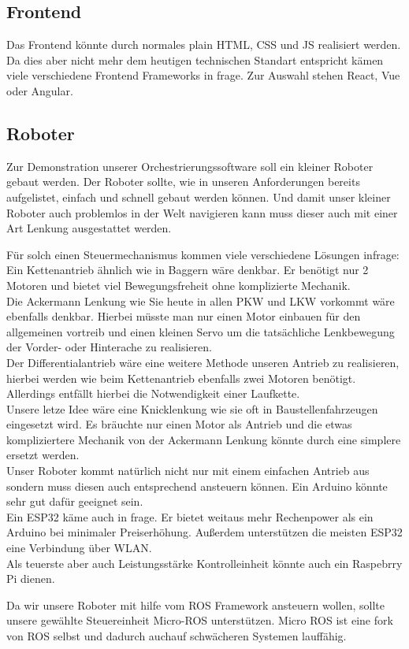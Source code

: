 \subsection{Frontend}
    Das Frontend könnte durch normales plain HTML, CSS und JS realisiert werden. 
    Da dies aber nicht mehr dem heutigen technischen Standart entspricht kämen viele verschiedene Frontend Frameworks in frage.
    Zur Auswahl stehen React, Vue oder Angular.

\subsection{Roboter}
    Zur Demonstration unserer Orchestrierungssoftware soll ein kleiner Roboter gebaut werden.
    Der Roboter sollte, wie in unseren Anforderungen bereits aufgelistet, einfach und schnell gebaut werden können.
    Und damit unser kleiner Roboter auch problemlos in der Welt navigieren kann muss dieser auch mit einer Art Lenkung ausgestattet werden.

    Für solch einen Steuermechanismus kommen viele verschiedene Lösungen infrage:
    \\
    Ein Kettenantrieb ähnlich wie in Baggern wäre denkbar. Er benötigt nur 2 Motoren und bietet viel Bewegungsfreheit ohne komplizierte Mechanik. 
    \\
    Die Ackermann Lenkung wie Sie heute in allen PKW und LKW vorkommt wäre ebenfalls denkbar. Hierbei müsste man 
    nur einen Motor einbauen für den allgemeinen vortreib und einen kleinen Servo um die tatsächliche Lenkbewegung der
    Vorder- oder Hinterache zu realisieren. 
    \\
    Der Differentialantrieb wäre eine weitere Methode unseren Antrieb zu realisieren, hierbei werden wie beim Kettenantrieb
    ebenfalls zwei Motoren benötigt. Allerdings entfällt hierbei die Notwendigkeit einer Laufkette.
    \\
    Unsere letze Idee wäre eine Knicklenkung wie sie oft in Baustellenfahrzeugen eingesetzt wird. Es bräuchte nur einen Motor
    als Antrieb und die etwas kompliziertere Mechanik von der Ackermann Lenkung könnte durch eine simplere ersetzt werden.
    \\

    Unser Roboter kommt natürlich nicht nur mit einem einfachen Antrieb aus sondern muss diesen auch entsprechend 
    ansteuern können.
    Ein Arduino könnte sehr gut dafür geeignet sein.
    \\
    Ein ESP32 käme auch in frage. Er bietet weitaus mehr Rechenpower als ein Arduino bei minimaler Preiserhöhung.
    Außerdem unterstützen die meisten ESP32 eine Verbindung über WLAN.
    \\
    Als teuerste aber auch Leistungsstärke Kontrolleinheit könnte auch ein Raspebrry Pi dienen.
    
    Da wir unsere Roboter mit hilfe vom ROS Framework ansteuern wollen, sollte unsere gewählte Steuereinheit Micro-ROS unterstützen.
    Micro ROS ist eine fork von ROS selbst und dadurch auchauf schwächeren Systemen lauffähig.